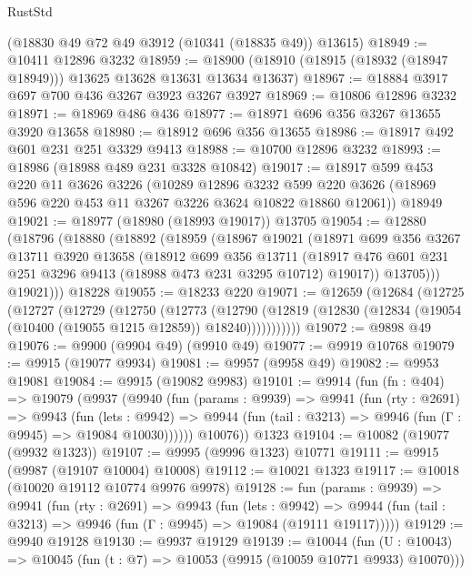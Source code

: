 \begin{lexlean}{RustStd}
\begin{coremodule}
{\begin{coremodule}
{{{{{{{{{{{{{{{{{{{{{{{{{    (@18830 @49 @72 @49 @3912 (@10341 (@18835 @49)) @13615)
@18949 := @10411 @12896 @3232
@18959 := @18900 (@18910 (@18915 (@18932 (@18947 @18949))) @13625 @13628 @13631 @13634 @13637)
@18967 := @18884 @3917 @697 @700 @436 @3267 @3923 @3267 @3927
@18969 := @10806 @12896 @3232
@18971 := @18969 @486 @436
@18977 := @18971 @696 @356 @3267 @13655 @3920 @13658
@18980 := @18912 @696 @356 @13655
@18986 := @18917 @492 @601 @231 @251 @3329 @9413
@18988 := @10700 @12896 @3232
@18993 := @18986 (@18988 @489 @231 @3328 @10842)
@19017 := @18917
    @599
    @453
    @220
    @11
    @3626
    @3226
    (@10289
      @12896
      @3232
      @599
      @220
      @3626
      (@18969 @596 @220 @453 @11 @3267 @3226 @3624 @10822 @18860 @12061))
    @18949
@19021 := @18977 (@18980 (@18993 @19017)) @13705
@19054 := @12880
    (@18796
      (@18880
        (@18892
          (@18959
            (@18967
              @19021
              (@18971
                @699
                @356
                @3267
                @13711
                @3920
                @13658
                (@18912
                  @699
                  @356
                  @13711
                  (@18917 @476 @601 @231 @251 @3296 @9413 (@18988 @473 @231 @3295 @10712) @19017))
                @13705)))
          @19021)))
    @18228
@19055 := @18233 @220
@19071 := @12659
    (@12684
      (@12725
        (@12727
          (@12729
            (@12750
              (@12773
                (@12790
                  (@12819 (@12830 (@12834 (@19054 (@10400 (@19055 @1215 @12859)) @18240)))))))))))
@19072 := @9898 @49
@19076 := @9900 (@9904 @49) (@9910 @49)
@19077 := @9919 @10768
@19079 := @9915 (@19077 @9934)
@19081 := @9957 (@9958 @49)
@19082 := @9953 @19081
@19084 := @9915 (@19082 @9983)
@19101 := @9914
    (fun (fn : @404) =>
    @19079
      (@9937
        (@9940
          (fun (params : @9939) =>
          @9941
            (fun (rty : @2691) =>
            @9943
              (fun (lets : @9942) =>
              @9944 (fun (tail : @3213) => @9946 (fun (Γ : @9945) => @19084 @10030))))))
        @10076))
    @1323
@19104 := @10082 (@19077 (@9932 @1323))
@19107 := @9995 (@9996 @1323) @10771
@19111 := @9915 (@9987 (@19107 @10004) @10008)
@19112 := @10021 @1323
@19117 := @10018 (@10020 @19112 @10774 @9976 @9978)
@19128 := fun (params : @9939) =>
  @9941
    (fun (rty : @2691) =>
    @9943
      (fun (lets : @9942) =>
      @9944 (fun (tail : @3213) => @9946 (fun (Γ : @9945) => @19084 (@19111 @19117)))))
@19129 := @9940 @19128
@19130 := @9937 @19129
@19139 := @10044
    (fun (U : @10043) => @10045 (fun (t : @7) => @10053 (@9915 (@10059 @10771 @9933) @10070)))
}}}}}}}}}}}}}}}}}}}}}}}}}
\end{coremodule}}
\end{coremodule}
\end{lexlean}
